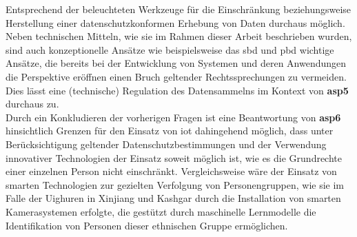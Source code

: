Entsprechend der beleuchteten Werkzeuge für die Einschränkung beziehungsweise Herstellung einer datenschutzkonformen Erhebung von Daten durchaus möglich. Neben technischen Mitteln, wie sie im Rahmen dieser Arbeit beschrieben wurden, sind auch konzeptionelle Ansätze wie beispielsweise das \ac{sbd} und \ac{pbd} wichtige Ansätze, die bereits bei der Entwicklung von Systemen und deren Anwendungen die Perspektive eröffnen einen Bruch geltender Rechtssprechungen zu vermeiden. Dies lässt eine (technische) Regulation des Datensammelns im Kontext von \textbf{\ac{asp}5} durchaus zu.\\
Durch ein Konkludieren der vorherigen Fragen ist eine Beantwortung von \textbf{\ac{asp}6} hinsichtlich Grenzen für den Einsatz von \ac{iot} dahingehend möglich, dass unter Berücksichtigung geltender Datenschutzbestimmungen und der Verwendung innovativer Technologien der Einsatz soweit möglich ist, wie es die Grundrechte einer einzelnen Person nicht einschränkt. Vergleichsweise wäre der Einsatz von smarten Technologien zur gezielten Verfolgung von Personengruppen, wie sie im Falle der Uighuren in Xinjiang und Kashgar \cite{Drexel2020} durch die Installation von smarten Kamerasystemen erfolgte, die gestützt durch maschinelle Lernmodelle die Identifikation von Personen dieser ethnischen Gruppe ermöglichen.
